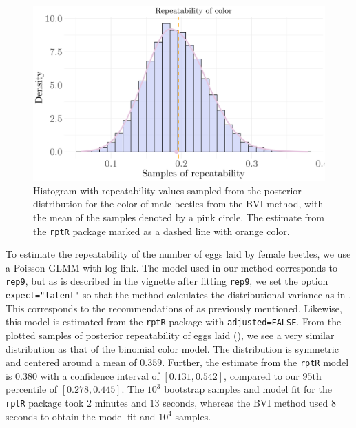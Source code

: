 \begin{figure}[H]
  \centering
  \includegraphics[width=1\linewidth]{Figures/Stoffel Comparison/Heritability_colour_Binomial.png}
  \caption[Estimated repeatability of color in male beetles]{Histogram with repeatability values sampled from the posterior distribution for the color of male beetles from the BVI method, with the mean of the samples denoted by a pink circle. The estimate from the \texttt{rptR} package marked as a dashed line with orange color.}
  \label{fig:heritability_colour_Binomial}
\end{figure}
\noindent To estimate the repeatability of the number of eggs laid by female beetles, we use a Poisson GLMM with log-link. The model used in our method corresponds to \texttt{rep9}, but as is described in the vignette after fitting \texttt{rep9}, we set the option \texttt{expect="latent"} so that the method calculates the distributional variance as in . This corresponds to the recommendations of \citet{nakagawa2017} as previously mentioned. Likewise, this model is estimated from the \texttt{rptR} package with \texttt{adjusted=FALSE}. From the plotted samples of posterior repeatability of eggs laid (), we see a very similar distribution as that of the binomial color model. The distribution is symmetric and centered around a mean of $0.359$. Further, the estimate from the \texttt{rptR} model is $0.380$ with a confidence interval of $[0.131, 0.542]$, compared to our $95$th percentile of $[0.278, 0.445]$. The $10^3$ bootstrap samples and model fit for the \texttt{rptR} package took $2$ minutes and $13$ seconds, whereas the BVI method used $8$ seconds to obtain the model fit and $10^4$ samples.
